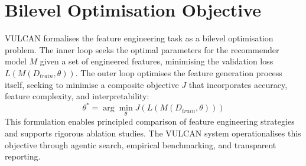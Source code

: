 \section{Bilevel Optimisation Objective}
VULCAN formalises the feature engineering task as a bilevel optimisation problem. The inner loop seeks the optimal parameters for the recommender model $M$ given a set of engineered features, minimising the validation loss $L(M(D_{train}, \theta))$. The outer loop optimises the feature generation process itself, seeking to minimise a composite objective $J$ that incorporates accuracy, feature complexity, and interpretability:
\begin{equation}
    \theta^* = \arg\min_{\theta} J(L(M(D_{train}, \theta)))
\end{equation}
This formulation enables principled comparison of feature engineering strategies and supports rigorous ablation studies. The VULCAN system operationalises this objective through agentic search, empirical benchmarking, and transparent reporting.